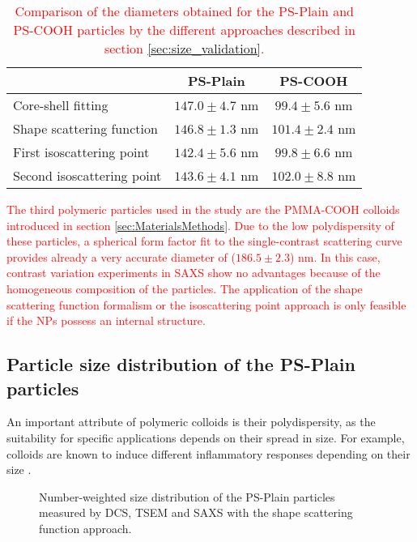 \begin{table}
\caption[Comparison of the diameters obtained by different evaluation approaches.]{\textcolor{red}{Comparison of the diameters obtained for the PS-Plain and PS-COOH particles by the different approaches described in section \ref{sec:size_validation}.}}
\begin{tabular}{l|cc}
& PS-Plain    &  PS-COOH\\
\hline
Core-shell fitting &  $147.0 \pm 4.7$ nm   &     $99.4 \pm 5.6$ nm     \\
Shape scattering function &  $146.8 \pm 1.3$ nm   &   $101.4 \pm 2.4$ nm \\
First isoscattering point &  $142.4 \pm 5.6$ nm    &     $99.8 \pm 6.6$ nm \\
Second isoscattering point &  $143.6 \pm 4.1$ nm  &   $102.0 \pm 8.8$ nm    \\ \hline
\end{tabular}
\label{tab:comparison_results_polymers}
\end{table}

\textcolor{red}{The third polymeric particles used in the study are the PMMA-COOH colloids introduced in section \ref{sec:MaterialsMethods}. Due to the low polydispersity of these particles, a spherical form factor fit to the single-contrast scattering curve provides already a very accurate diameter of ($186.5\pm2.3$) nm. In this case, contrast variation experiments in SAXS show no advantages because of the homogeneous composition of the particles. The application of the shape scattering function formalism or the isoscattering point approach is only feasible if the NPs possess an internal structure.}

\subsection{Particle size distribution of the PS-Plain particles}

An important attribute of polymeric colloids is their polydispersity, as the suitability for specific applications depends on their spread in size. For example, colloids are known to induce different inflammatory responses depending on their size \citep{kusaka_effect_2014}.

\begin{figure}
	\begin{center}
		
	\end{center}
	\caption[Number-weighted size distribution of the PS-Plain particles.]{Number-weighted size distribution of the PS-Plain particles measured by DCS, TSEM \citep{nicolet_inter-laboratory_2016} and SAXS with the shape scattering function approach.}
	\label{fig:PSPlainSizeDistribution}
\end{figure}

